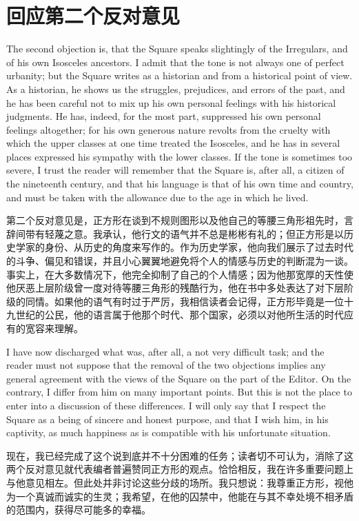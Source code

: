 \documentclass[12pt,UTF8]{ctexbook}
\begin{document}
\section*{回应第二个反对意见}

The second objection is, that the Square speaks slightingly of the Irregulars, and of his own Isosceles ancestors. I admit that the tone is not always one of perfect urbanity; but the Square writes as a historian and from a historical point of view. As a historian, he shows us the struggles, prejudices, and errors of the past, and he has been careful not to mix up his own personal feelings with his historical judgments. He has, indeed, for the most part, suppressed his own personal feelings altogether; for his own generous nature revolts from the cruelty with which the upper classes at one time treated the Isosceles, and he has in several places expressed his sympathy with the lower classes. If the tone is sometimes too severe, I trust the reader will remember that the Square is, after all, a citizen of the nineteenth century, and that his language is that of his own time and country, and must be taken with the allowance due to the age in which he lived.

第二个反对意见是，正方形在谈到不规则图形以及他自己的等腰三角形祖先时，言辞间带有轻蔑之意。我承认，他行文的语气并不总是彬彬有礼的；但正方形是以历史学家的身份、从历史的角度来写作的。作为历史学家，他向我们展示了过去时代的斗争、偏见和错误，并且小心翼翼地避免将个人的情感与历史的判断混为一谈。事实上，在大多数情况下，他完全抑制了自己的个人情感；因为他那宽厚的天性使他厌恶上层阶级曾一度对待等腰三角形的残酷行为，他在书中多处表达了对下层阶级的同情。如果他的语气有时过于严厉，我相信读者会记得，正方形毕竟是一位十九世纪的公民，他的语言属于他那个时代、那个国家，必须以对他所生活的时代应有的宽容来理解。

I have now discharged what was, after all, a not very difficult task; and the reader must not suppose that the removal of the two objections implies any general agreement with the views of the Square on the part of the Editor. On the contrary, I differ from him on many important points. But this is not the place to enter into a discussion of these differences. I will only say that I respect the Square as a being of sincere and honest purpose, and that I wish him, in his captivity, as much happiness as is compatible with his unfortunate situation.

现在，我已经完成了这个说到底并不十分困难的任务；读者切不可认为，消除了这两个反对意见就代表编者普遍赞同正方形的观点。恰恰相反，我在许多重要问题上与他意见相左。但此处并非讨论这些分歧的场所。我只想说：我尊重正方形，视他为一个真诚而诚实的生灵；我希望，在他的囚禁中，他能在与其不幸处境不相矛盾的范围内，获得尽可能多的幸福。
\end{document}
